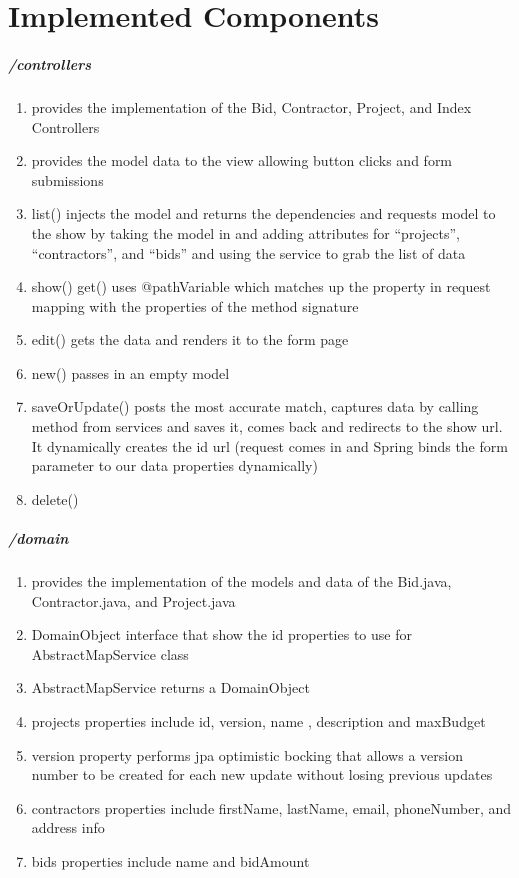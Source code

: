 \documentclass[a4paper,12pt]{article}
\begin{document}
\section{Implemented Components}
\indent\subparagraph{/controllers}
\begin{enumerate}[label=(\alph*)]
\item provides the implementation of the Bid, Contractor, Project, and Index Controllers
\item provides the model data to the view allowing button clicks and form submissions
\item list() injects the model and returns the dependencies and requests model to the show by taking the model in and adding attributes for “projects”, “contractors”, and “bids” and using the service to grab the list of data
\item show()  get() uses @pathVariable which matches up the property in request mapping with the properties of the method signature
\item edit() gets the data and renders it to the form page
\item new() passes in an empty model
\item saveOrUpdate() posts the most accurate match, captures data by calling method from services and saves it, comes back and redirects to the show url. It dynamically creates the id url (request comes in and Spring binds the form parameter to our data properties dynamically)
\item delete()

\end{enumerate}

\subparagraph{/domain}
\begin{enumerate}[label=(\alph*)]
\item provides the implementation of the models and data of the Bid.java, Contractor.java, and Project.java
\item DomainObject interface that show the id properties to use for AbstractMapService class
\item AbstractMapService returns a DomainObject
\item projects properties include id, version, name , description and maxBudget
\item version property performs jpa optimistic bocking that allows a version number to be created for each new update without losing previous updates
\item contractors properties include firstName, lastName, email, phoneNumber, and address info
\item bids properties include name and bidAmount

\end{enumerate}
\end{document}
